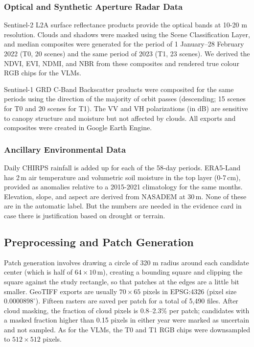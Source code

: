 \documentclass[11pt]{article}
\begin{document}
\subsubsection{Optical and Synthetic Aperture Radar Data}

Sentinel-2 L2A surface reflectance products provide the optical bands at 10-20 m resolution. Clouds and shadows were masked using the Scene Classification Layer, and median composites were generated for the period of 1 January–28 February 2022 (T0, 20 scenes) and the same period of 2023 (T1, 23 scenes). We derived the NDVI, EVI, NDMI, and NBR from these composites and rendered true colour RGB chips for the VLMs.

Sentinel-1 GRD C-Band Backscatter products were composited for the same periods using the direction of the majority of orbit passes (descending; 15 scenes for T0 and 20 scenes for T1). The VV and VH polarizations (in dB) are sensitive to canopy structure and moisture but not affected by clouds. All exports and composites were created in Google Earth Engine.

\subsubsection{Ancillary Environmental Data}

Daily CHIRPS rainfall is added up for each of the 58-day periods.
ERA5-Land has 2\,m air temperature and volumetric soil moisture in the
top layer (0-7\,cm), provided as anomalies relative to a 2015-2021
climatology for the same months. Elevation, slope, and aspect are derived from NASADEM at 30\,m. None
of these are in the automatic label. But the numbers are needed in
the evidence card in case there is justification based on drought or
terrain.

\subsection{Preprocessing and Patch Generation}

Patch generation involves drawing a circle of 320 m radius
around each candidate center (which is half of $64 \times 10$\,m),
creating a bounding square and clipping the square against the
study rectangle, so that patches at the edges are a little bit smaller.
GeoTIFF exports are usually $70 \times 65$ pixels in EPSG:4326 (pixel size $0.0000898^\circ$).
Fifteen rasters are saved per patch for a total of 5,490 files. After cloud masking, the fraction of cloud pixels is 0.8--2.3\%
per patch; candidates with a masked fraction higher than 0.15
pixels in either year were marked as uncertain and not sampled. As
for the VLMs, the T0 and T1 RGB chips were downsampled to
$512 \times 512$ pixels.
\end{document}
